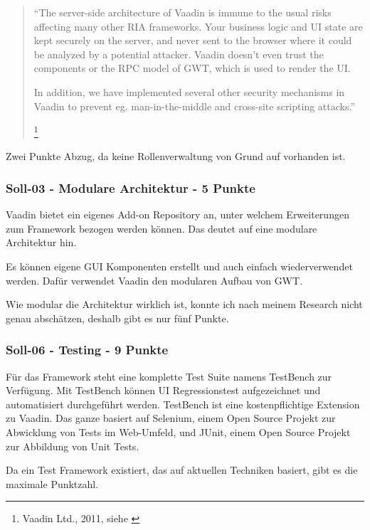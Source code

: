   \begin{quote}
  \begin{itshape}``The server-side architecture of Vaadin is immune to the usual
  risks affecting many other RIA frameworks. Your business logic and UI state
  are kept securely on the server, and never sent to the browser where it could
  be analyzed by a potential attacker. Vaadin doesn't even trust the components
  or the RPC model of GWT, which is used to render the UI.

  In addition, we have implemented several other security mechanisms in Vaadin
  to prevent eg. man-in-the-middle and cross-site scripting
  attacks.''\end{itshape}
  \footnote{Vaadin Ltd., 2011, siehe \cite{VaadinSecurityAlerts}}
  \end{quote}
  
  Zwei Punkte Abzug, da keine Rollenverwaltung von Grund auf vorhanden ist.
  
  \subsubsection{Soll-03 - Modulare Architektur - 5 Punkte}
  
  Vaadin bietet ein eigenes Add-on Repository an, unter welchem Erweiterungen
  zum Framework bezogen werden können. Das deutet auf eine modulare Architektur
  hin.
  
  Es können eigene \ac{GUI} Komponenten erstellt und auch einfach
  wiederverwendet werden. Dafür verwendet Vaadin den modularen Aufbau von
  \ac{GWT}.
  
  Wie modular die Architektur wirklich ist, konnte ich nach meinem Research
  nicht genau abschätzen, deshalb gibt es nur fünf Punkte.
  
  \subsubsection{Soll-06 - Testing - 9 Punkte}
  
  Für das Framework steht eine komplette Test Suite namens TestBench zur
  Verfügung. Mit TestBench können UI Regressionstest aufgezeichnet und
  automatisiert durchgeführt werden. TestBench ist eine kostenpflichtige
  Extension zu Vaadin. Das ganze basiert auf Selenium, einem Open Source
  Projekt zur Abwicklung von Tests im Web-Umfeld, und JUnit, einem Open Source
  Projekt zur Abbildung von Unit Tests.
  
  Da ein Test Framework existiert, das auf aktuellen Techniken basiert, gibt es
  die maximale Punktzahl.
  
